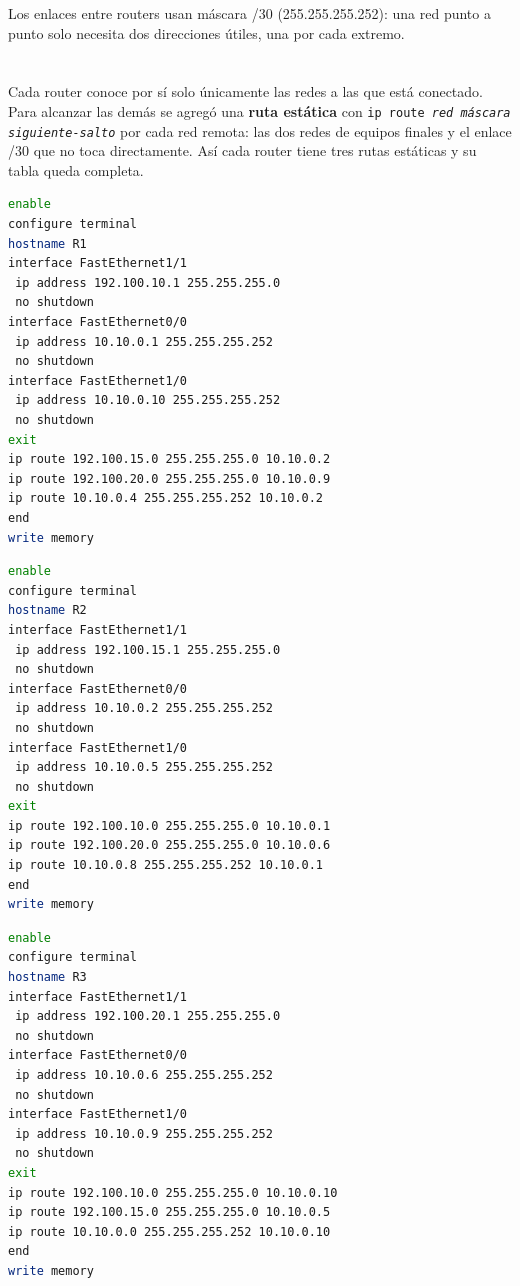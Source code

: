 \documentclass[10pt,a4paper]{article}
\begin{document}
Los enlaces entre routers usan máscara /30 (255.255.255.252): una red punto a punto solo necesita dos direcciones útiles, una por cada extremo.

\section{\color{colorIPN}{Desarrollo}}

\subsection{\color{colorESCOM}{Configuración de los routers}}

Cada router conoce por sí solo únicamente las redes a las que está conectado. Para alcanzar las demás se agregó una \textbf{ruta estática} con \texttt{ip route \textit{red máscara siguiente-salto}} por cada red remota: las dos redes de equipos finales y el enlace /30 que no toca directamente. Así cada router tiene tres rutas estáticas y su tabla queda completa.

\begin{lstlisting}[language=bash, caption={Configuración de R1}]
enable
configure terminal
hostname R1
interface FastEthernet1/1
 ip address 192.100.10.1 255.255.255.0
 no shutdown
interface FastEthernet0/0
 ip address 10.10.0.1 255.255.255.252
 no shutdown
interface FastEthernet1/0
 ip address 10.10.0.10 255.255.255.252
 no shutdown
exit
ip route 192.100.15.0 255.255.255.0 10.10.0.2
ip route 192.100.20.0 255.255.255.0 10.10.0.9
ip route 10.10.0.4 255.255.255.252 10.10.0.2
end
write memory
\end{lstlisting}

\begin{lstlisting}[language=bash, caption={Configuración de R2}]
enable
configure terminal
hostname R2
interface FastEthernet1/1
 ip address 192.100.15.1 255.255.255.0
 no shutdown
interface FastEthernet0/0
 ip address 10.10.0.2 255.255.255.252
 no shutdown
interface FastEthernet1/0
 ip address 10.10.0.5 255.255.255.252
 no shutdown
exit
ip route 192.100.10.0 255.255.255.0 10.10.0.1
ip route 192.100.20.0 255.255.255.0 10.10.0.6
ip route 10.10.0.8 255.255.255.252 10.10.0.1
end
write memory
\end{lstlisting}

\begin{lstlisting}[language=bash, caption={Configuración de R3}]
enable
configure terminal
hostname R3
interface FastEthernet1/1
 ip address 192.100.20.1 255.255.255.0
 no shutdown
interface FastEthernet0/0
 ip address 10.10.0.6 255.255.255.252
 no shutdown
interface FastEthernet1/0
 ip address 10.10.0.9 255.255.255.252
 no shutdown
exit
ip route 192.100.10.0 255.255.255.0 10.10.0.10
ip route 192.100.15.0 255.255.255.0 10.10.0.5
ip route 10.10.0.0 255.255.255.252 10.10.0.10
end
write memory
\end{lstlisting}
\end{document}
